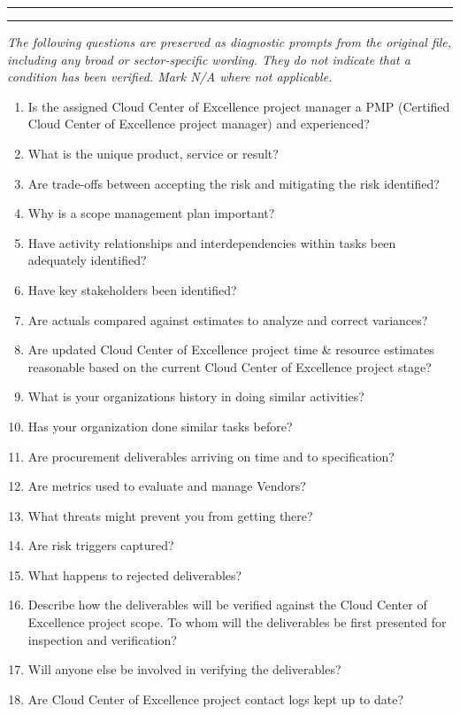 \documentclass[10pt,letterpaper]{article}
\newcommand{\writelines}{\par\noindent\color{rulegrey}\rule{\linewidth}{.35pt}\par\vspace{7pt}\rule{\linewidth}{.35pt}\color{black}\par\vspace{7pt}}
\newcommand{\docsection}[1]{\par\Needspace{5\baselineskip}\vspace{8pt}{\large\sffamily\bfseries\color{navy}#1}\par\vspace{2pt}{\color{rulegrey}\rule{\linewidth}{.6pt}}\par}
\begin{document}
\writelines
\docsection{03 \quad Source diagnostic checklist}
\textit{The following questions are preserved as diagnostic prompts from the original file, including any broad or sector-specific wording. They do not indicate that a condition has been verified. Mark N/A where not applicable.}
\begingroup\small\begin{enumerate}[leftmargin=2.1em, itemsep=4pt]
\item[1.] Is the assigned Cloud Center of Excellence project manager a PMP (Certified Cloud Center of Excellence project manager) and experienced?
\item[2.] What is the unique product, service or result?
\item[3.] Are trade-offs between accepting the risk and mitigating the risk identified?
\item[4.] Why is a scope management plan important?
\item[5.] Have activity relationships and interdependencies within tasks been adequately identified?
\item[6.] Have key stakeholders been identified?
\item[7.] Are actuals compared against estimates to analyze and correct variances?
\item[8.] Are updated Cloud Center of Excellence project time \& resource estimates reasonable based on the current Cloud Center of Excellence project stage?
\item[9.] What is your organizations history in doing similar activities?
\item[10.] Has your organization done similar tasks before?
\item[11.] Are procurement deliverables arriving on time and to specification?
\item[12.] Are metrics used to evaluate and manage Vendors?
\item[13.] What threats might prevent you from getting there?
\item[14.] Are risk triggers captured?
\item[15.] What happens to rejected deliverables?
\item[16.] Describe how the deliverables will be verified against the Cloud Center of Excellence project scope. To whom will the deliverables be first presented for inspection and verification?
\item[17.] Will anyone else be involved in verifying the deliverables?
\item[18.] Are Cloud Center of Excellence project contact logs kept up to date?

\end{enumerate}
\end{document}
